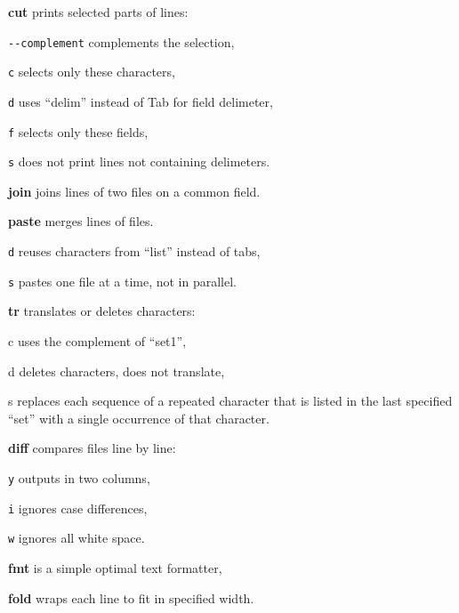 \begin{enumx}
	\item [\cmdblack] \textbf{cut} prints selected parts of lines:
	\item [] \texttt{-}\texttt{-}\texttt{complement} complements the selection,
	\item [\texttt{c}] selects only these characters,
	\item [\texttt{d}] uses ``delim'' instead of Tab for field delimeter,
	\item [\texttt{f}] selects only these fields,
	\item [\texttt{s}] does not print lines not containing delimeters.
	\item [\cmdblack] \textbf{join} joins lines of two files on a common field.
	\item [\cmdblack] \textbf{paste} merges lines of files.
	\item [\texttt{d}] reuses characters from ``list'' instead of tabs,
	\item [\texttt{s}] pastes one file at a time, not in parallel.
	\item [\cmdblack] \textbf{tr} translates or deletes characters:
	\item [c] uses the complement of ``set1'',
	\item [d] deletes characters, does not translate,
	\item [s] replaces each sequence of a repeated character that is listed 
	in the last specified ``set'' with a single occurrence of that character.
\end{enumx}

\begin{enumx}
	\item [\cmd] \textbf{diff} compares files line by line:
	\item [\texttt{y}] outputs in two columns,
	\item [\texttt{i}] ignores case differences,
	\item [\texttt{w}] ignores all white space.
\end{enumx}

\begin{enumx}
	\item [\cmd] \textbf{fmt} is a simple optimal text formatter, 
	\item [\cmd] \textbf{fold} wraps each line to fit in specified width.
\end{enumx}

